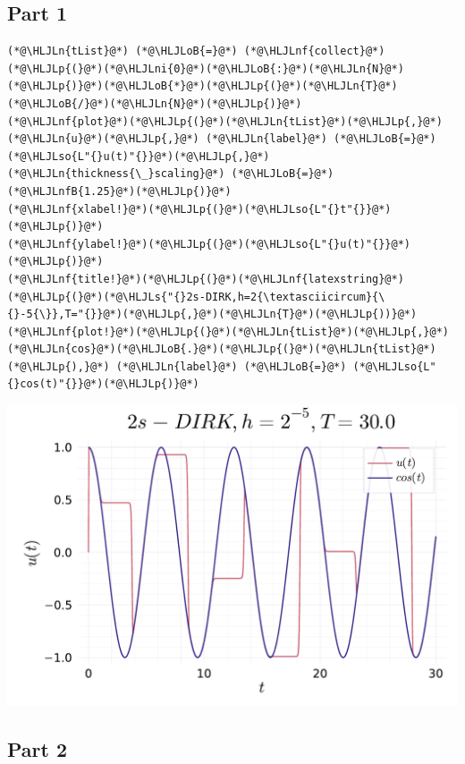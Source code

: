 \documentclass[12pt,a4paper]{article}
\newcommand{\HLJLn}[1]{#1}
\newcommand{\HLJLnf}[1]{\textcolor[RGB]{66,102,213}{#1}}
\newcommand{\HLJLs}[1]{\textcolor[RGB]{201,61,57}{#1}}
\newcommand{\HLJLso}[1]{\textcolor[RGB]{201,61,57}{#1}}
\newcommand{\HLJLnfB}[1]{\textcolor[RGB]{59,151,46}{#1}}
\newcommand{\HLJLni}[1]{\textcolor[RGB]{59,151,46}{#1}}
\newcommand{\HLJLoB}[1]{\textcolor[RGB]{102,102,102}{\textbf{#1}}}
\newcommand{\HLJLp}[1]{#1}
\begin{document}
\subsection{Part 1}

\begin{lstlisting}
(*@\HLJLn{tList}@*) (*@\HLJLoB{=}@*) (*@\HLJLnf{collect}@*)(*@\HLJLp{(}@*)(*@\HLJLni{0}@*)(*@\HLJLoB{:}@*)(*@\HLJLn{N}@*)(*@\HLJLp{)}@*)(*@\HLJLoB{*}@*)(*@\HLJLp{(}@*)(*@\HLJLn{T}@*)(*@\HLJLoB{/}@*)(*@\HLJLn{N}@*)(*@\HLJLp{)}@*)
(*@\HLJLnf{plot}@*)(*@\HLJLp{(}@*)(*@\HLJLn{tList}@*)(*@\HLJLp{,}@*) (*@\HLJLn{u}@*)(*@\HLJLp{,}@*) (*@\HLJLn{label}@*) (*@\HLJLoB{=}@*) (*@\HLJLso{L"{}u(t)"{}}@*)(*@\HLJLp{,}@*) (*@\HLJLn{thickness{\_}scaling}@*) (*@\HLJLoB{=}@*)(*@\HLJLnfB{1.25}@*)(*@\HLJLp{)}@*)
(*@\HLJLnf{xlabel!}@*)(*@\HLJLp{(}@*)(*@\HLJLso{L"{}t"{}}@*)(*@\HLJLp{)}@*)
(*@\HLJLnf{ylabel!}@*)(*@\HLJLp{(}@*)(*@\HLJLso{L"{}u(t)"{}}@*)(*@\HLJLp{)}@*)
(*@\HLJLnf{title!}@*)(*@\HLJLp{(}@*)(*@\HLJLnf{latexstring}@*)(*@\HLJLp{(}@*)(*@\HLJLs{"{}2s-DIRK,h=2{\textasciicircum}{\{}-5{\}},T="{}}@*)(*@\HLJLp{,}@*)(*@\HLJLn{T}@*)(*@\HLJLp{))}@*)
(*@\HLJLnf{plot!}@*)(*@\HLJLp{(}@*)(*@\HLJLn{tList}@*)(*@\HLJLp{,}@*) (*@\HLJLn{cos}@*)(*@\HLJLoB{.}@*)(*@\HLJLp{(}@*)(*@\HLJLn{tList}@*)(*@\HLJLp{),}@*) (*@\HLJLn{label}@*) (*@\HLJLoB{=}@*) (*@\HLJLso{L"{}cos(t)"{}}@*)(*@\HLJLp{)}@*)
\end{lstlisting}

\includegraphics[width=\linewidth]{figures/ass_3_report_7_1.pdf}

\subsection{Part 2}
\end{document}
